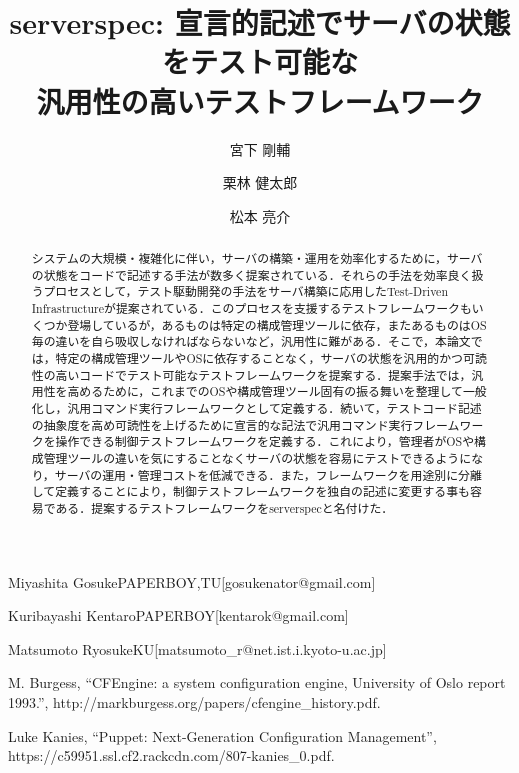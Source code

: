 \documentclass[submit,techreq,noauthor]{ipsj}
\begin{document}
\title{serverspec: 宣言的記述でサーバの状態をテスト可能な\\
汎用性の高いテストフレームワーク}




\author{宮下 剛輔}{Miyashita Gosuke}{PAPERBOY,TU}[gosukenator@gmail.com]
\author{栗林 健太郎}{Kuribayashi Kentaro}{PAPERBOY}[kentarok@gmail.com]
\author{松本 亮介}{Matsumoto Ryosuke}{KU}[matsumoto\_r@net.ist.i.kyoto-u.ac.jp]

\begin{abstract}
システムの大規模・複雑化に伴い，サーバの構築・運用を効率化するために，サーバの状態をコードで記述する手法が数多く提案されている．それらの手法を効率良く扱うプロセスとして，テスト駆動開発の手法をサーバ構築に応用したTest-Driven Infrastructureが提案されている．このプロセスを支援するテストフレームワークもいくつか登場しているが，あるものは特定の構成管理ツールに依存，またあるものはOS毎の違いを自ら吸収しなければならないなど，汎用性に難がある．そこで，本論文では，特定の構成管理ツールやOSに依存することなく，サーバの状態を汎用的かつ可読性の高いコードでテスト可能なテストフレームワークを提案する．提案手法では，汎用性を高めるために，これまでのOSや構成管理ツール固有の振る舞いを整理して一般化し，汎用コマンド実行フレームワークとして定義する．続いて，テストコード記述の抽象度を高め可読性を上げるために宣言的な記法で汎用コマンド実行フレームワークを操作できる制御テストフレームワークを定義する．これにより，管理者がOSや構成管理ツールの違いを気にすることなくサーバの状態を容易にテストできるようになり，サーバの運用・管理コストを低減できる．また，フレームワークを用途別に分離して定義することにより，制御テストフレームワークを独自の記述に変更する事も容易である．提案するテストフレームワークをserverspecと名付けた．
\end{abstract}

\maketitle



\begin{thebibliography}{10}

M. Burgess, ``CFEngine: a system configuration engine,
University of Oslo report 1993.'',
http://markburgess.org/papers/cfengine\_history.pdf.

Luke Kanies, ``Puppet: Next-Generation Configuration Management'',
https://c59951.ssl.cf2.rackcdn.com/807-kanies\_0.pdf.

\end{thebibliography}
\end{document}
